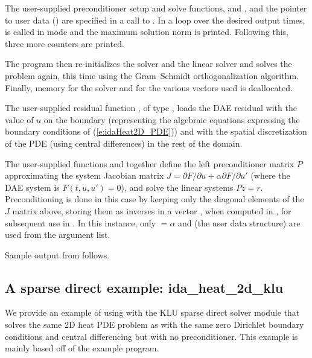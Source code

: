 The user-supplied preconditioner setup and solve functions, 
and , and the pointer to user data () are specified
in a call to .
In a loop over the desired output times,  is called in 
mode and the maximum solution norm is printed.
Following this, three more counters are printed.

The  program then re-initializes the {\ida} solver and the
{\sunlinsolspgmr} linear solver and solves the problem again, this time
using the  Gram--Schmidt orthogonalization algorithm.
Finally, memory for the {\ida} solver and for the various vectors used is deallocated.

The user-supplied residual function , of type ,
loads the DAE residual with the value of $u$ on the boundary
(representing the algebraic equations expressing the boundary
conditions of (\ref{e:idaHeat2D_PDE})) and with the spatial discretization 
of the PDE (using central differences) in the rest of the domain.

The user-supplied functions  and  together define the 
left preconditioner matrix $P$ approximating the system Jacobian matrix
$J = \partial F/ \partial u + \alpha \partial F/ \partial u'$ (where the DAE
system is $F(t,u,u') = 0$), and solve the linear systems $P z = r$.   
Preconditioning  is done in this case by keeping only the diagonal elements of 
the $J$ matrix above, storing them as inverses in a vector , when computed
in , for subsequent use in .
In this instance, only  $=\alpha$ and  (the user data
structure) are used from the  argument list.

Sample output from  follows.
\subsection{A sparse direct example: ida\_heat\_2d\_klu}\label{ss:idaHeat2Dklu}

We provide an example of using {\ida} with the KLU sparse direct solver module
{\sunlinsolklu} that solves the same 2D heat PDE problem as 
with the same zero Dirichlet boundary conditions and central differencing but
with no preconditioner. This example is mainly based off of the
 example program.

